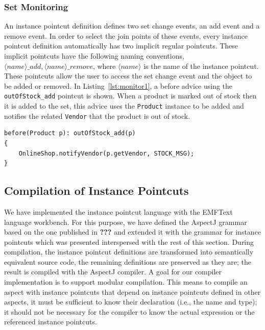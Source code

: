\documentclass{acm_proc_article-sp}
\begin{document}
\subsubsection{Set Monitoring}
An instance pointcut definition defines two set change events, an add event and a remove event. In order to select the join points of these events, every instance pointcut definition automatically has two implicit regular pointcuts. These implicit pointcuts have the following naming conventions, $\langle name \rangle\_add, \langle name \rangle\_remove$, where $\langle name \rangle$ is the name of the instance pointcut. These pointcuts allow the user to access the set change event and the object to be added or removed. In Listing~\ref{lst:monitor1}, a before advice using the \texttt{outOfStock_add} pointcut is shown. When a product is marked out of stock then it is added to the set, this advice uses the \texttt{Product} instance to be added and notifies the related \texttt{Vendor} that the product is out of stock.

\begin{lstlisting}[float=h!, caption={Set monitoring pointcut used to notify vendors}, label={lst:monitor1}]
before(Product p): outOfStock_add(p)
{
	OnlineShop.notifyVendor(p.getVendor, STOCK_MSG);
}
\end{lstlisting}






\subsection{Compilation of Instance Pointcuts}


We have implemented the instance pointcut language with the EMFText language workbench.
For this purpose, we have defined the AspectJ grammar based on the one published in \textbf{???} and extended it with the grammar for instance pointcuts which was presented interspersed with the rest of this section.
During compilation, the instance pointcut definitions are transformed into semantically equivalent source code, the remaining definitions are preserved as they are; the result is compiled with the AspectJ compiler.
A goal for our compiler implementation is to support modular compilation.
This means to compile an aspect with instance pointcuts that depend on instance pointcuts defined in other aspects, it must be sufficient to know their declaration (i.e., the name and type); it should not be necessary for the compiler to know the actual expression or the referenced instance pointcuts.
\end{document}
